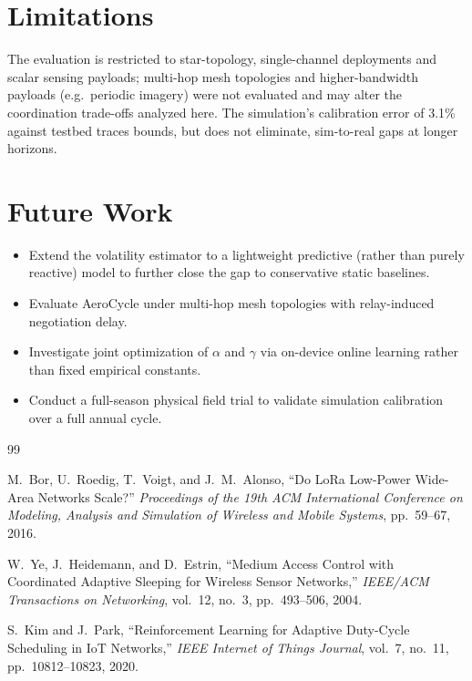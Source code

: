\documentclass[12pt,a4paper]{report}
\begin{document}
\section{Limitations}
The evaluation is restricted to star-topology, single-channel deployments and scalar sensing
payloads; multi-hop mesh topologies and higher-bandwidth payloads (e.g.\ periodic imagery)
were not evaluated and may alter the coordination trade-offs analyzed here. The simulation's
calibration error of 3.1\% against testbed traces bounds, but does not eliminate,
sim-to-real gaps at longer horizons.

\section{Future Work}
\begin{itemize}[leftmargin=1.4em]
  \item Extend the volatility estimator to a lightweight predictive (rather than purely
        reactive) model to further close the gap to conservative static baselines.
  \item Evaluate AeroCycle under multi-hop mesh topologies with relay-induced negotiation
        delay.
  \item Investigate joint optimization of $\alpha$ and $\gamma$ via on-device online
        learning rather than fixed empirical constants.
  \item Conduct a full-season physical field trial to validate simulation calibration over
        a full annual cycle.
\end{itemize}

\begin{thebibliography}{99}

M.~Bor, U.~Roedig, T.~Voigt, and J.~M.~Alonso,
``Do LoRa Low-Power Wide-Area Networks Scale?''
\emph{Proceedings of the 19th ACM International Conference on Modeling, Analysis and
Simulation of Wireless and Mobile Systems}, pp.~59--67, 2016.

W.~Ye, J.~Heidemann, and D.~Estrin,
``Medium Access Control with Coordinated Adaptive Sleeping for Wireless Sensor Networks,''
\emph{IEEE/ACM Transactions on Networking}, vol.~12, no.~3, pp.~493--506, 2004.

S.~Kim and J.~Park,
``Reinforcement Learning for Adaptive Duty-Cycle Scheduling in IoT Networks,''
\emph{IEEE Internet of Things Journal}, vol.~7, no.~11, pp.~10812--10823, 2020.

\end{thebibliography}
\end{document}
